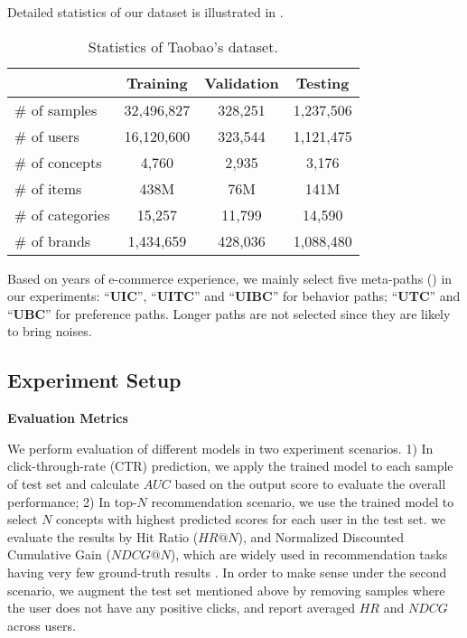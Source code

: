 Detailed statistics of our dataset is illustrated in .
\begin{table}[th]
	\centering
	\begin{tabular}{l|c|c|c}
		\hline
		  & Training & Validation & Testing \\
		\hline
		\# of samples & 32,496,827 & 328,251 & 1,237,506 \\
		\# of users & 16,120,600 & 323,544 & 1,121,475 \\
		\# of concepts & 4,760 & 2,935 & 3,176 \\
		\hline
		\# of items & 438M & 76M  & 141M \\
		\# of categories & 15,257 & 11,799 & 14,590 \\
		\# of brands & 1,434,659 & 428,036 & 1,088,480 \\
		\hline
	\end{tabular}
	\caption{Statistics of Taobao's dataset.}
	\label{tab:exp_data}
\end{table}

Based on years of e-commerce experience, we mainly select five meta-paths () in our experiments: ``\textbf{UIC}'', ``\textbf{UITC}'' and ``\textbf{UIBC}'' for behavior  paths; ``\textbf{UTC}'' and ``\textbf{UBC}'' for preference paths.
Longer paths are not selected since they are likely to bring noises.




\subsection{Experiment Setup}

\noindent
\textbf{Evaluation Metrics}

\noindent
We perform evaluation of different models in two experiment scenarios.
1) In click-through-rate (CTR) prediction, we apply the trained model to each sample of test set and calculate $AUC$ based on the output score to evaluate the overall performance; 2) In top-$N$ recommendation scenario, 
we use the trained model to select $N$ concepts with highest predicted scores for each user in the test set. 
we evaluate the results by Hit Ratio ($HR@N$), and Normalized  Discounted Cumulative Gain ($NDCG@N$),
which are widely used in recommendation tasks having very few ground-truth results \cite{huang2018improving,chen2018sequential}.
In order to make sense under the second scenario, 
we augment the test set mentioned above by removing samples where the user does not have any positive clicks,
and report averaged $HR$ and $NDCG$ across users.

